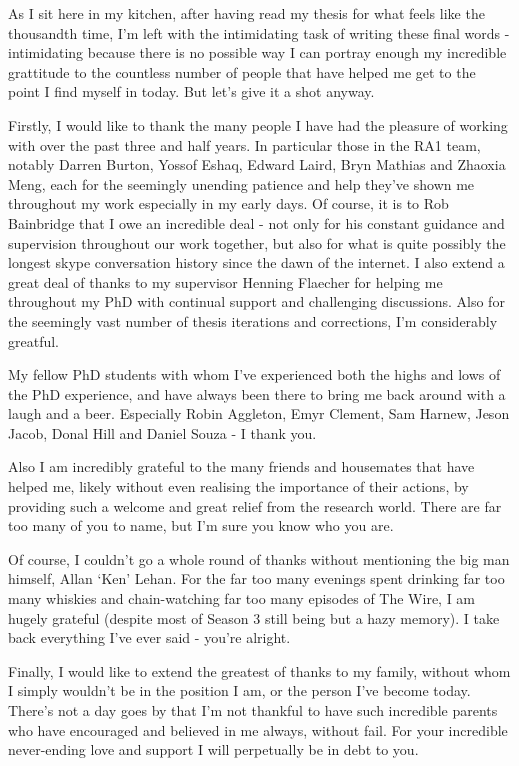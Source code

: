 
\begin{acknowledgements}      

\begin{spacing}{1}
As I sit here in my kitchen, after having read my thesis for what feels like
the
thousandth time, I'm left with the intimidating task of writing these final
words - intimidating because there is no possible way I can portray enough my
incredible grattitude to the countless number of people that have helped me
get to the point I find myself in today. But let's give it a shot anyway.

Firstly, I would like to thank the many people I have had the pleasure of
working with
over the past three and half years. In particular those in
the RA1 team, notably Darren Burton, Yossof Eshaq, Edward
Laird, Bryn Mathias and Zhaoxia Meng, each for the seemingly unending patience
and help
they've shown me throughout my work especially in my early days. Of course, it
is to Rob Bainbridge that I
owe an incredible deal - not only for his constant guidance and supervision
throughout our work together, but also for what is quite possibly the longest
skype conversation history since the dawn of the internet.
I also extend a great deal of thanks to my supervisor Henning Flaecher for
helping me throughout my PhD with continual support and challenging discussions.
Also for the seemingly vast number of thesis iterations and corrections, I'm
considerably greatful.

My fellow PhD students with whom I've experienced both the highs and lows of
the PhD experience, and have always been there to bring me back around with a
laugh
and a beer. Especially Robin Aggleton, Emyr Clement, Sam Harnew, Jeson Jacob,
Donal Hill
and Daniel Souza - I thank you.

Also I am incredibly grateful to the many friends and housemates that have helped me, likely without
even realising the importance of their actions, by
providing such a welcome and great relief from the research world. There are
far too many of you to name, but I'm sure you know who you are.

Of course, I couldn't go a whole round of thanks without mentioning the big man
himself, Allan `Ken' Lehan. For the far too many evenings spent
drinking far too many whiskies and chain-watching far too many episodes of The
Wire, I am hugely grateful (despite most of Season 3 still being but a hazy
memory). I take back everything I've ever said - you're alright.

Finally, I would like to extend the greatest of thanks to my family, without whom
I simply wouldn't be in the position I am, or the person I've become today.
There's not a day goes by that I'm not thankful to have such incredible parents
who have encouraged and believed in me always, without fail.
For your incredible never-ending love and support I will perpetually be in debt
to you.
\end{spacing}

\end{acknowledgements}

